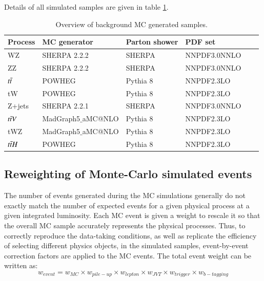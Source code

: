 Details of all simulated samples are given in table \ref{tab:backgrounds}.

\begin{table}[!h]
     \centering
      \begin{tabular}{@{} *6l  @{}}
      \toprule
      Process & MC generator & Parton shower & PDF set \\
     \midrule
      WZ & SHERPA 2.2.2 \cite{sherpa12004,sherpa2009} & SHERPA  & NNPDF3.0NNLO  \\[0.2ex] 
      ZZ & SHERPA 2.2.2 & SHERPA & NNPDF3.0NNLO  \\[0.2ex]
      $t\Bar{t}$ & POWHEG \cite{powhegOleari:2010nx} & Pythia 8 \cite{pythia2006} & NNPDF2.3LO  \\[0.2ex]
      tW & POWHEG & Pythia 8 & NNPDF2.3LO  \\[0.2ex]
      Z+jets & SHERPA 2.2.1 & SHERPA & NNPDF3.0NNLO  \\[0.2ex]
      $t\Bar{t}V$ & MadGraph5$\_$aMC@NLO & Pythia 8 \cite{pythia82015}&  NNPDF2.3LO  \\[0.2ex]
      tWZ & MadGraph5$\_$aMC@NLO & Pythia 8 &  NNPDF2.3LO  \\[0.2ex]
      $t\Bar{t}H$ & POWHEG  & Pythia 8 &  NNPDF2.3LO  \\[0.2ex]
      \bottomrule
 \end{tabular}
 \caption{Overview of background MC generated samples.}
 \label{tab:backgrounds}
 \end{table}

\newpage

\subsection{Reweighting of Monte-Carlo simulated events}
\label{subsec:reweightingofMC}
The number of events generated during the MC simulations generally do not exactly match the number of expected events for a given physical process at a given integrated luminosity. Each MC event is given a weight to rescale it so that the overall MC sample accurately represents the physical processes. Thus, to correctly reproduce the data-taking conditions, as well as replicate the efficiency of selecting different physics objects, in the simulated samples, event-by-event correction factors are applied to the MC events. The total event weight can be written as:
\begin{equation}
    \label{eqn:weight}
    w_{event} = w_{MC}\times w_{pile-up} \times w_{lepton} \times w_{JVT} \times w_{trigger} \times w_{b-tagging}
\end{equation}

